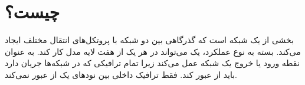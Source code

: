 \documentclass{article}
\begin{document}
\section{ چیست؟}
 بخشی از یک شبکه است که گذرگاهی بین دو شبکه با پروتکل‌های انتقال مختلف ایجاد می‌کند. بسته به نوع عملکرد، یک  می‌تواند در هر یک از هفت لایه مدل  کار کند.  به عنوان نقطه ورود یا خروج یک شبکه عمل می‌کند زیرا تمام ترافیکی که در شبکه‌ها جریان دارد باید از  عبور کند. فقط ترافیک داخلی بین نودهای یک  از  عبور نمی‌کند. 
 
 
 
\end{document}
